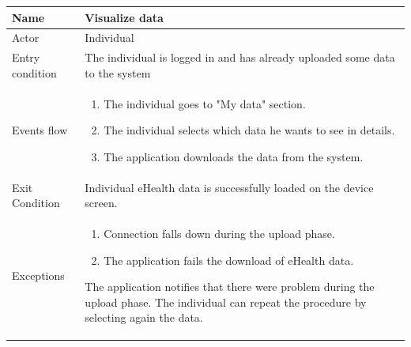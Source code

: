\begin{table}[p]
\centering
\begin{tabular}{|l|p{11cm}|}
    \hline
    Name & Visualize data
    \\ \hline
    Actor & Individual
    \\ \hline 
    Entry condition & The individual is logged in and has already uploaded some data to the system
    \\ \hline
    Events flow &
    \begin{enumerate}
    \item The individual goes to "My data" section.
    \item The individual selects which data he wants to see in details.
    \item The application downloads the data from the system.
    \end{enumerate}
     \\ \hline
     Exit Condition & Individual eHealth data is successfully loaded on the device screen.
     \\
    \hline
    Exceptions &
    \begin{enumerate}
    \item Connection falls down during the upload phase.
    \item The application fails the download of eHealth data.
    \end{enumerate}
  The application notifies that there were problem during the upload phase. The individual can repeat the procedure by selecting again the data.
      \\
    \hline
\end{tabular}
\end{table}

